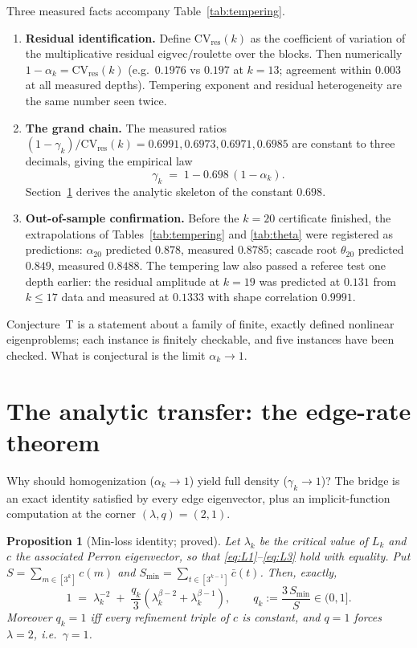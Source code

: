 \documentclass[11pt]{article}
\newtheorem{proposition}[theorem]{Proposition}
\theoremstyle{definition}
\theoremstyle{remark}
\newcommand{\CV}{\mathrm{CV}}
\newcommand{\lam}{\lambda}
\newcommand{\gam}{\gamma}
\newcommand{\bet}{\beta}
\begin{document}
Three measured facts accompany Table~\ref{tab:tempering}.

\begin{enumerate}
\item \textbf{Residual identification.} Define $\CV_{\mathrm{res}}(k)$ as the
coefficient of variation of the multiplicative residual
$\mathrm{eigvec}/\mathrm{roulette}$ over the blocks. Then numerically
$1 - \alpha_k = \CV_{\mathrm{res}}(k)$ (e.g.\ $0.1976$ vs $0.197$ at $k=13$;
agreement within $0.003$ at all measured depths). Tempering exponent and
residual heterogeneity are the same number seen twice.
\item \textbf{The grand chain.} The measured ratios
$(1 - \gam_k)/\CV_{\mathrm{res}}(k) = 0.6991, 0.6973, 0.6971, 0.6985$ are
constant to three decimals, giving the empirical law
\[
\gam_k \;=\; 1 - 0.698\,(1 - \alpha_k).
\]
Section~\ref{sec:edge} derives the analytic skeleton of the constant $0.698$.
\item \textbf{Out-of-sample confirmation.} Before the $k = 20$ certificate
finished, the extrapolations of Tables~\ref{tab:tempering} and
\ref{tab:theta} were registered as predictions: $\alpha_{20}$ predicted
$0.878$, measured $0.8785$; cascade root $\theta_{20}$ predicted $0.849$,
measured $0.8488$. The tempering law also passed a referee test one depth
earlier: the residual amplitude at $k = 19$ was predicted at $0.131$ from
$k \leq 17$ data and measured at $0.1333$ with shape correlation $0.9991$.
\end{enumerate}

Conjecture~T is a statement about a family of finite, exactly defined
nonlinear eigenproblems; each instance is finitely checkable, and five
instances have been checked. What is conjectural is the limit
$\alpha_k \to 1$.

\section{The analytic transfer: the edge-rate theorem}
\label{sec:edge}

Why should homogenization ($\alpha_k \to 1$) yield full density
($\gam_k \to 1$)? The bridge is an exact identity satisfied by every edge
eigenvector, plus an implicit-function computation at the corner
$(\lam, q) = (2, 1)$.

\begin{proposition}[Min-loss identity; proved]\label{prop:minloss}
Let $\lam_k$ be the critical value of $L_k$ and $c$ the associated Perron
eigenvector, so that \eqref{eq:L1}--\eqref{eq:L3} hold with equality. Put
$S = \sum_{m \in [3^k]} c(m)$ and
$S_{\min} = \sum_{t \in [3^{k-1}]} \bar c(t)$. Then, exactly,
\begin{equation}
1 \;=\; \lam_k^{-2} \;+\; \frac{q_k}{3}\left( \lam_k^{\bet-2} + \lam_k^{\bet-1} \right),
\qquad
q_k := \frac{3\, S_{\min}}{S} \in (0, 1].
\label{eq:minloss}
\end{equation}
Moreover $q_k = 1$ iff every refinement triple of $c$ is constant, and $q = 1$
forces $\lam = 2$, i.e.\ $\gam = 1$.
\end{proposition}
\end{document}
